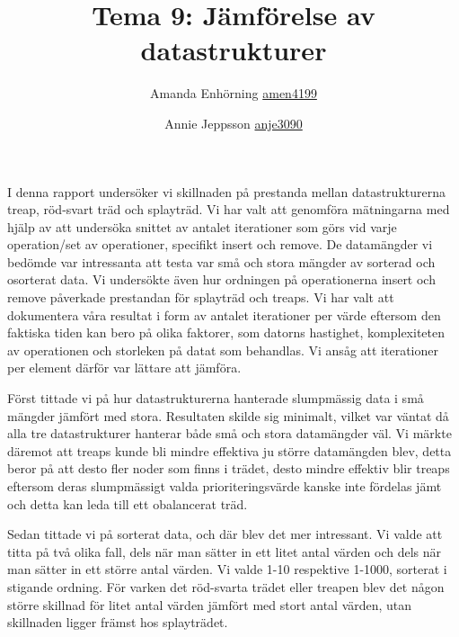 \documentclass[a4paper,10pt,oneside]{article}
\title{Tema 9: Jämförelse av datastrukturer}
\author{Amanda Enhörning \url{amen4199} \and Annie Jeppsson \url{anje3090}}
\begin{document}
\maketitle

I denna rapport undersöker vi skillnaden på prestanda mellan datastrukturerna treap, röd-svart träd och splayträd. Vi har valt att genomföra mätningarna med hjälp av att undersöka snittet av antalet iterationer som görs vid varje operation/set av operationer, specifikt insert och remove. De datamängder vi bedömde var intressanta att testa var små och stora mängder av sorterad och osorterat data. Vi undersökte även hur ordningen på operationerna insert och remove påverkade prestandan för splayträd och treaps. Vi har valt att dokumentera våra resultat i form av antalet iterationer per värde eftersom den faktiska tiden kan bero på olika faktorer, som datorns hastighet, komplexiteten av operationen och storleken på datat som behandlas. Vi ansåg att iterationer per element därför var lättare att jämföra.

Först tittade vi på hur datastrukturerna hanterade slumpmässig data i små mängder jämfört med stora. Resultaten skilde sig minimalt, vilket var väntat då alla tre datastrukturer hanterar både små och stora datamängder väl. Vi märkte däremot att treaps kunde bli mindre effektiva ju större datamängden blev, detta beror på att desto fler noder som finns i trädet, desto mindre effektiv blir treaps eftersom deras slumpmässigt valda prioriteringsvärde kanske inte fördelas jämt och detta kan leda till ett obalancerat träd.

Sedan tittade vi på sorterat data, och där blev det mer intressant. Vi valde att titta på två olika fall, dels när man sätter in ett litet antal värden och dels när man sätter in ett större antal värden. Vi valde 1-10 respektive 1-1000, sorterat i stigande ordning. För varken det röd-svarta trädet eller treapen blev det någon större skillnad för litet antal värden jämfört med stort antal värden, utan skillnaden ligger främst hos splayträdet.
\end{document}
